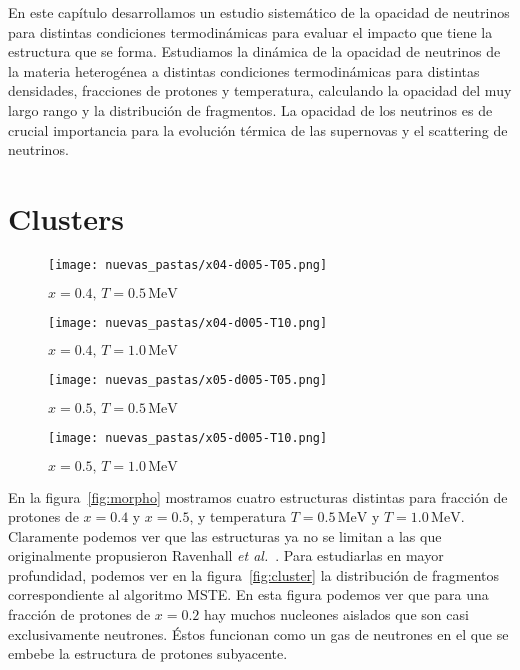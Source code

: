 En este capítulo desarrollamos un estudio sistemático de la opacidad de neutrinos para distintas condiciones termodinámicas para evaluar el impacto que tiene la estructura que se forma.
Estudiamos la dinámica de la opacidad de neutrinos de la materia heterogénea a distintas condiciones termodinámicas para distintas densidades, fracciones de protones y temperatura, calculando la opacidad del muy largo rango y la distribución de fragmentos.
La opacidad de los neutrinos es de crucial importancia para la evolución térmica de las supernovas y el scattering de neutrinos.

\section{Clusters}\label{sc:clusters}

\begin{figure*}[H,floatfix]  \centering
  \begin{subfigure}[h!]{0.40\columnwidth}
    \texttt{[image: nuevas\_pastas/x04-d005-T05.png]}
    \caption{$x=0.4,\, T=0.5\,\text{MeV}$}
    \label{subfig:04-05}
  \end{subfigure}
  \begin{subfigure}[h!]{0.40\columnwidth}
    \texttt{[image: nuevas\_pastas/x04-d005-T10.png]}
    \caption{$x=0.4,\, T=1.0\,\text{MeV}$}
    \label{subfig:04-10}
  \end{subfigure}
  \begin{subfigure}[h!]{0.40\columnwidth}
    \texttt{[image: nuevas\_pastas/x05-d005-T05.png]}
    \caption{$x=0.5,\, T=0.5\,\text{MeV}$}
    \label{subfig:05-05}
  \end{subfigure}
  \begin{subfigure}[h!]{0.40\columnwidth}
    \texttt{[image: nuevas\_pastas/x05-d005-T10.png]}
    \caption{$x=0.5,\, T=1.0\,\text{MeV}$}
    \label{subfig:05-10}
  \end{subfigure}
  \caption{Estructuras del sistema con densidad $\rho = 0.04\,\text{fm}^{-3}$ para distintos valores de fracción de protones y temperatura.
    Las estructuras obtenidas a $T=0.5\,\text{MeV}$ difieren considerablemente.
    Sin embargo, ambas muestran inhomogeneidades.
    Podemos ver en el panel~\ref{subfig:05-05} una línea verde que marca la longitud de $\approx 15\,\text{fm}$.}
  \label{fig:morpho}
\end{figure*}

En la figura~\ref{fig:morpho} mostramos cuatro estructuras distintas para fracción de protones de $x=0.4$ y $x=0.5$, y temperatura $T=0.5\,\text{MeV}$ y $T=1.0\,\text{MeV}$.
Claramente podemos ver que las estructuras ya no se limitan a las que originalmente propusieron Ravenhall \emph{et al.}~\cite{ravenhall_structure_1983}.
Para estudiarlas en mayor profundidad, podemos ver en la figura~\ref{fig:cluster} la distribución de fragmentos correspondiente al algoritmo MSTE.\@
En esta figura podemos ver que para una fracción de protones de $x=0.2$ hay muchos nucleones aislados que son casi exclusivamente neutrones.
Éstos funcionan como un gas de neutrones en el que se embebe la estructura de protones subyacente.

